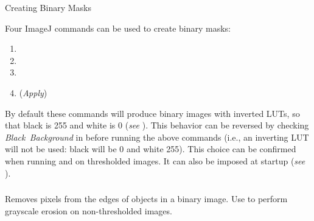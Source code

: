 \begin{infobox}
\caption{\label{infobox:InvertedLutMask}Creating Binary Masks}


\noindent Four ImageJ commands can be used to create binary
masks:
\begin{enumerate}
\item {}
\item {}
\item {}
\item {}
(\emph{Apply})
\end{enumerate}
\noindent By default these commands will produce binary images with
inverted LUTs, so that black is 255 and white is 0 (\emph{see} ).
This behavior can be reversed by checking \emph{Black~Background}
in 
before running the above commands (i.e., an inverting LUT will not
be used: black will be 0 and white 255). This choice can be confirmed
when running 
and  on thresholded
images. It can also be imposed at startup (\emph{see} ).


\end{infobox}



\subsubsection{\protect{}\label{sub:Erode}}

Removes pixels from the edges of objects in a binary image. Use 
to perform grayscale erosion
on non-thresholded images.




\subsubsection{\protect{}\label{sub:Dilate}}

